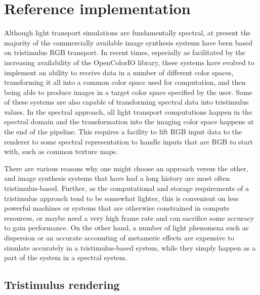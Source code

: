 
\chapter{Reference implementation}\label{ch:implementation}

Although light transport simulations are fundamentally spectral, at present
the majority of the commercially available image synthesis systems have been
based on tristimulus \gls{RGB} transport.
In recent times, especially as facilitated by the increasing availability of the
OpenColorIO library, these systems have evolved to implement an ability to receive
data in a number of different color spaces, transforming it all into a common
color space used for computation, and then being able to produce images in a
target color space specified by the user. Some of these systems are also
capable of transforming spectral data into tristimulus values.
In the spectral approach, all light transport computations happen in the
spectral domain and the transformation into the imaging color space
happens at the end of the pipeline. This requires a facility to lift \gls{RGB}
input data to the renderer to some spectral representation to handle inputs
that are \gls{RGB} to start with, such as common texture maps.

There are various reasons why one might choose an approach versus the other,
and image synthesis systems that have had a long history are most often
tristimulus-based. Further, as the computational and storage requirements
of a tristimulus approach tend to be somewhat lighter, this is convenient on
less powerful machines or systems that are otherwise constrained in compute
resources, or maybe need a very high frame rate and can
sacrifice some accuracy to gain performance. On the other
hand, a number of light phenomena such as dispersion or an accurate accounting
of metameric effects are expensive to simulate accurately in a tristimulus-based
system, while they simply happen as a part of the system in a spectral system.

\section{Tristimulus rendering}

\def\colspacefont#1{\texttt{#1}}
\def\camRGBl{\ensuremath{\colspacefont{cameraRGB}_\ell}}
\def\sRGBl{\ensuremath{\colspacefont{sRGB}_\ell}}
\def\sRGBg{\ensuremath{\colspacefont{sRGB}_\gamma}}
\def\RecSONl{\ensuremath{\colspacefont{Rec709}_\ell}}
\def\RecSONg{\ensuremath{\colspacefont{Rec709}_\gamma}}



